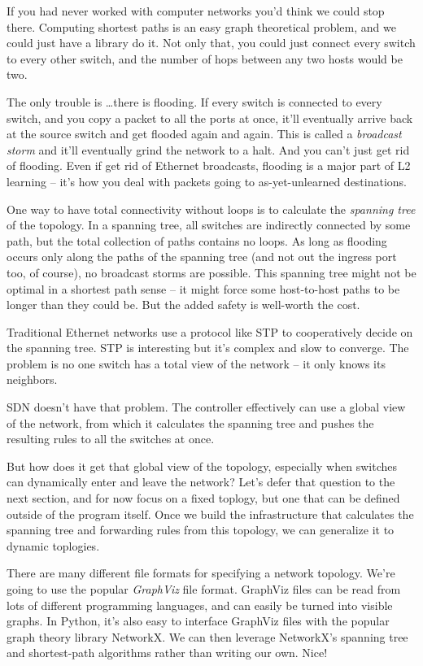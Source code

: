 If you had never worked with computer networks you'd think we could stop there.  Computing shortest paths
is an easy graph theoretical problem, and we could just have a library do it.  Not only that, you could
just connect every switch to every other switch, and the number of hops between any two hosts would be 
two.  

The only trouble is \ldots there is flooding.  If every switch is connected to every switch, and you copy
a packet to all the ports at once, it'll eventually arrive back at the source switch and get flooded again
and again.  This is called a \emph{broadcast storm} and it'll eventually grind the network to a halt.  
And you can't just get rid of flooding.  Even if get rid of Ethernet broadcasts, flooding is a major part
of L2 learning -- it's how you deal with packets going to as-yet-unlearned destinations.

One way to have total connectivity without loops is to calculate the \emph{spanning tree} of the topology.
In a spanning tree, all switches are indirectly connected by some path, but the total collection of
paths contains no loops.  As long as flooding occurs only along the paths of the spanning tree (and
not out the ingress port too, of course), no broadcast storms are possible.   This spanning tree
might not be optimal in a shortest path sense -- it might force some host-to-host paths to be longer than 
they could be.  But the added safety is well-worth the cost.  

Traditional Ethernet networks use a protocol like STP to cooperatively decide on the spanning tree.  STP is 
interesting but it's complex and slow to converge.  The problem is no one switch has a total view of the 
network -- it only knows its neighbors.  

SDN doesn't have that problem.  The controller effectively can use a
global view of the network, from which it calculates the spanning tree and pushes the resulting rules to all
the switches at once.  

But how does it get that global view of the topology, especially when switches can dynamically enter and leave the
network?  Let's defer that question to the next section, and for now focus on a fixed toplogy, but one that can be
defined outside of the program itself.  Once we build the infrastructure that calculates the spanning tree
and forwarding rules from this topology, we can generalize it to dynamic toplogies.  

There are many different file formats for specifying a network topology.  We're going to use the popular
\emph{GraphViz} file format.  GraphViz files can be read from lots of different programming languages, and can easily
be turned into visible graphs.  In Python, it's also easy to interface GraphViz files with the popular 
graph theory library NetworkX.  We can then leverage NetworkX's spanning tree and shortest-path 
algorithms rather than writing our own.  Nice!

